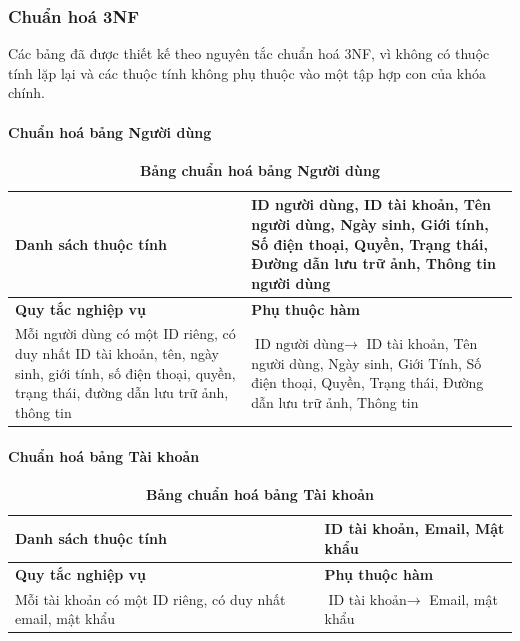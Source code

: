 \subsubsection{Chuẩn hoá 3NF}
Các bảng đã được thiết kế theo nguyên tắc chuẩn hoá 3NF, vì không có thuộc tính lặp lại và các thuộc tính không phụ thuộc vào một tập hợp con của khóa chính.

\paragraph{Chuẩn hoá bảng Người dùng}
\mbox{}
\begin{table}[H]
  \caption{\bfseries \fontsize{12pt}{0pt}\selectfont Bảng chuẩn hoá bảng Người dùng}
  \centering
  \begin{tabularx}{0.9\textwidth}{|X|X|}
    \hline
    \textbf{Danh sách thuộc tính} & ID người dùng, ID tài khoản, Tên người dùng, Ngày sinh, Giới tính, Số điện thoại, Quyền, Trạng thái, Đường dẫn lưu trữ ảnh, Thông tin người dùng \\
    \hline
    \textbf{Quy tắc nghiệp vụ} & \textbf{Phụ thuộc hàm} \\
    \hline
    Mỗi người dùng có một ID riêng, có duy nhất ID tài khoản, tên, ngày sinh, giới tính, số điện thoại, quyền,
    trạng thái, đường dẫn lưu trữ ảnh, thông tin & \parbox[t]{\linewidth}{$\text{ID người dùng} \rightarrow$ ID tài khoản, Tên người dùng, Ngày sinh, Giới Tính, Số điện thoại, Quyền, Trạng thái, Đường dẫn lưu trữ ảnh, Thông tin} \\
    \hline
     \\
     \\
    \hline
  \end{tabularx}
\end{table}

\paragraph{Chuẩn hoá bảng Tài khoản}
\mbox{}
\begin{table}[H]
  \caption{\bfseries \fontsize{12pt}{0pt}\selectfont Bảng chuẩn hoá bảng Tài khoản}
  \centering
  \begin{tabularx}{0.9\textwidth}{|X|X|}
    \hline
    \textbf{Danh sách thuộc tính} & ID tài khoản, Email, Mật khẩu \\
    \hline
    \textbf{Quy tắc nghiệp vụ} & \textbf{Phụ thuộc hàm} \\
    \hline
    Mỗi tài khoản có một ID riêng, có duy nhất email, mật khẩu 
    & \parbox[t]{\linewidth}{$\text{ID tài khoản} \rightarrow$ Email, mật khẩu} \\
    \hline
     \\
     \\
    \hline
  \end{tabularx}
\end{table}

